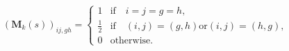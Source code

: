 \begin{equation}
	\left(
	\mathbf{M}_{k}
	\left(
	s
	\right)
	\right)_{ij, gh}
	=
	\begin{cases} 
		1 
		  &   
		\text{if} 
		\quad 
		i = j = g = h
		,
		\\
		\frac{1}{2} 
		  &   
		\text{if} 
		\quad 
		\left( i, j \right) = \left( g, h \right) 
		\text{or} 
		\left( i, j \right) = \left( h, g \right)
		, 
		\\
		0 
		  &   
		\text{otherwise}
		.
	\end{cases}
	\label{eq:linearAlgebra-mcap-sym}
\end{equation}

